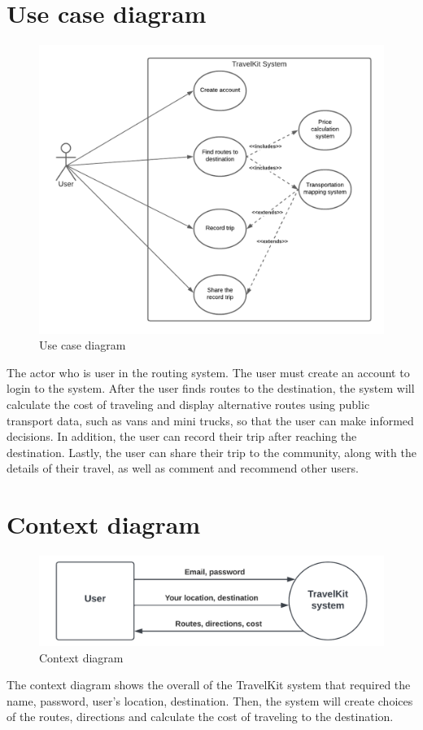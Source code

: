 \section{Use case diagram}
\begin{figure}[!h]
    \centering
    \includegraphics[width=0.7\linewidth]{chapter3/use-case-diagram.png}
    \caption{Use case diagram}
    \label{fig:Use case diagram}
\end{figure}
\par
The actor who is user in the routing system. The user must create an account to login to the system. After the user finds routes to the destination, the system will calculate the cost of traveling and display alternative routes using public transport data, such as vans and mini trucks, so that the user can make informed decisions. In addition, the user can record their trip after reaching the destination. Lastly, the user can share their trip to the community, along with the details of their travel, as well as comment and recommend other users.

\newpage
\section{Context diagram}
\begin{figure}[!h]
    \centering
    \includegraphics[width=1\linewidth]{chapter3/context-diagram.png}
    \caption{Context diagram}
    \label{fig:Context diagram}
\end{figure}
\par
The context diagram shows the overall of the TravelKit system that required the name, password, user’s location, destination. Then, the system will create choices of the routes, directions and calculate the cost of traveling to the destination.

